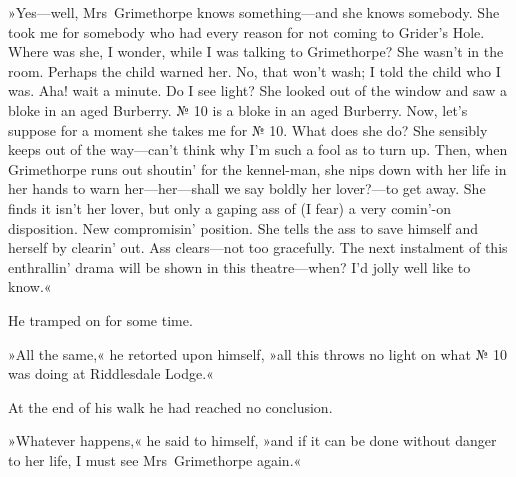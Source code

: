 »Yes—well, Mrs~Grimethorpe knows something—and she knows somebody.  She took me for somebody who had every reason for not coming to Grider's Hole. Where was she, I wonder, while I was talking to Grimethorpe? She wasn't in the room. Perhaps the child warned her. No, that won't wash; I told the child who I was. Aha! wait a minute. Do I see light? She looked out of the window and saw a bloke in an aged Burberry. № 10 is a bloke in an aged Burberry. Now, let's suppose for a moment she takes me for № 10. What does she do? She sensibly keeps out of the way—can't think why I'm such a fool as to turn up.  Then, when Grimethorpe runs out shoutin' for the kennel-man, she nips down with her life in her hands to warn her—her—shall we say boldly her lover?—to get away. She finds it isn't her lover, but only a gaping ass of (I fear) a very comin'-on disposition. New compromisin' position. She tells the ass to save himself and herself by clearin' out. Ass clears—not too gracefully. The next instalment of this enthrallin' drama will be shown in this theatre—when? I'd jolly well like to know.«

He tramped on for some time.

»All the same,« he retorted upon himself, »all this throws no light on what № 10 was doing at Riddlesdale Lodge.«

At the end of his walk he had reached no conclusion.

»Whatever happens,« he said to himself, »and if it can be done without danger to her life, I must see Mrs~Grimethorpe again.«



